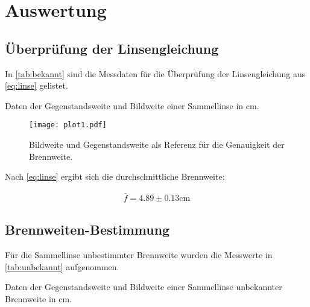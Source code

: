 \section{Auswertung}
\label{sec:Auswertung}

\subsection{Überprüfung der Linsengleichung}
In \autoref{tab:bekannt} sind die Messdaten für die Überprüfung der Linsengleichung aus \autoref{eq:linse} gelistet.

\begin{table}
  \centering
  \caption{Daten der Gegenstandsweite und Bildweite einer Sammellinse in $\si{\centi\metre}$.}
  \label{tab:bekannt}
\end{table}

\begin{figure}[htbp]
  \centering
  \texttt{[image: plot1.pdf]}
  \caption{Bildweite und Gegenstandsweite als Referenz für die Genauigkeit der Brennweite.}
  \label{fig:plot1}
\end{figure}

Nach \autoref{eq:linse} ergibt sich die durchschnittliche Brennweite:

\begin{align*}
  \bar{f} = 4.89\pm0.13\si{\centi\metre}
\end{align*}
\newpage
\subsection{Brennweiten-Bestimmung}

Für die Sammellinse unbestimmter Brennweite wurden die Messwerte in \autoref{tab:unbekannt} aufgenommen.

\begin{table}
  \centering
  \caption{Daten der Gegenstandsweite und Bildweite einer Sammellinse unbekannter Brennweite in $\si{\centi\metre}$.}
  \label{tab:unbekannt}
\end{table}


